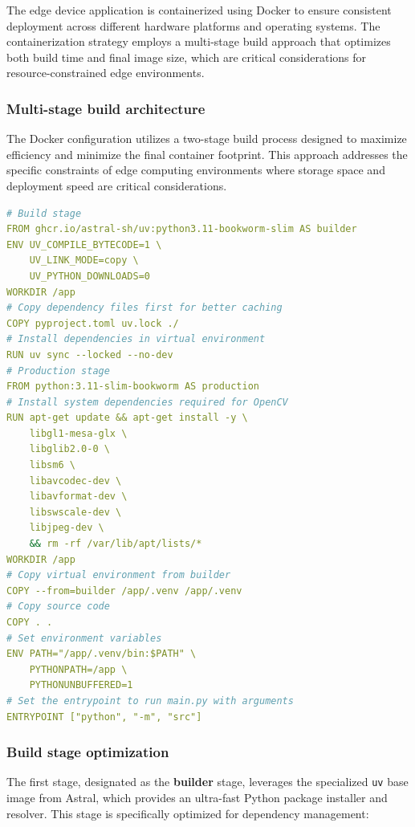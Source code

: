 The edge device application is containerized using Docker to ensure consistent deployment across different hardware platforms and operating systems. The containerization strategy employs a multi-stage build approach that optimizes both build time and final image size, which are critical considerations for resource-constrained edge environments.

\subsubsection{Multi-stage build architecture}

The Docker configuration utilizes a two-stage build process designed to maximize efficiency and minimize the final container footprint. This approach addresses the specific constraints of edge computing environments where storage space and deployment speed are critical considerations.

\begin{lstlisting}[language=yaml, caption={Multi-stage Docker build configuration for edge deployment}]
# Build stage
FROM ghcr.io/astral-sh/uv:python3.11-bookworm-slim AS builder
ENV UV_COMPILE_BYTECODE=1 \
    UV_LINK_MODE=copy \
    UV_PYTHON_DOWNLOADS=0
WORKDIR /app
# Copy dependency files first for better caching
COPY pyproject.toml uv.lock ./
# Install dependencies in virtual environment
RUN uv sync --locked --no-dev
# Production stage
FROM python:3.11-slim-bookworm AS production
# Install system dependencies required for OpenCV
RUN apt-get update && apt-get install -y \
    libgl1-mesa-glx \
    libglib2.0-0 \
    libsm6 \
    libavcodec-dev \
    libavformat-dev \
    libswscale-dev \
    libjpeg-dev \
    && rm -rf /var/lib/apt/lists/*
WORKDIR /app
# Copy virtual environment from builder
COPY --from=builder /app/.venv /app/.venv
# Copy source code
COPY . .
# Set environment variables
ENV PATH="/app/.venv/bin:$PATH" \
    PYTHONPATH=/app \
    PYTHONUNBUFFERED=1
# Set the entrypoint to run main.py with arguments
ENTRYPOINT ["python", "-m", "src"]
\end{lstlisting}

\subsubsection{Build stage optimization}

The first stage, designated as the \textbf{builder} stage, leverages the specialized \texttt{uv} base image from Astral, which provides an ultra-fast Python package installer and resolver. This stage is specifically optimized for dependency management:

